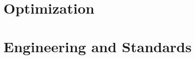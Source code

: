 \documentclass[11pt,a4paper,oneside,openany]{scrbook}
\newif\ifaimGerman
\theoremstyle{plain}
\theoremstyle{definition}
\theoremstyle{remark}
\begin{document}

\ifaimGerman
  
  
  
\else
  
  
  
\fi

\ifaimGerman
  \part{Optimierung}
\else
  \part{Optimization}
\fi

\ifaimGerman
  
\else
  
\fi


\ifaimGerman
  
\else
  
\fi


\ifaimGerman
  
\else
  
\fi
\ifaimGerman
  
  
\else
  
  
\fi
\ifaimGerman
  
\else
  
\fi

\ifaimGerman
  \part{Ingenieurwesen und Standards}
\else
  \part{Engineering and Standards}
\fi
\end{document}
